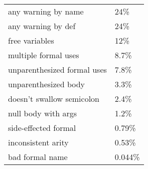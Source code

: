 \begin{tabular}{|l|l|} \hline
any warning by name & 24\% \\ 
any warning by def & 24\% \\ 
free variables & 12\% \\ 
multiple formal uses & 8.7\% \\ 
unparenthesized formal uses & 7.8\% \\ 
unparenthesized body & 3.3\% \\ 
doesn't swallow semicolon & 2.4\% \\ 
null body with args & 1.2\% \\ 
side-effected formal & 0.79\% \\ 
inconsistent arity & 0.53\% \\ 
bad formal name & 0.044\% \\ 
\hline
\end{tabular}
